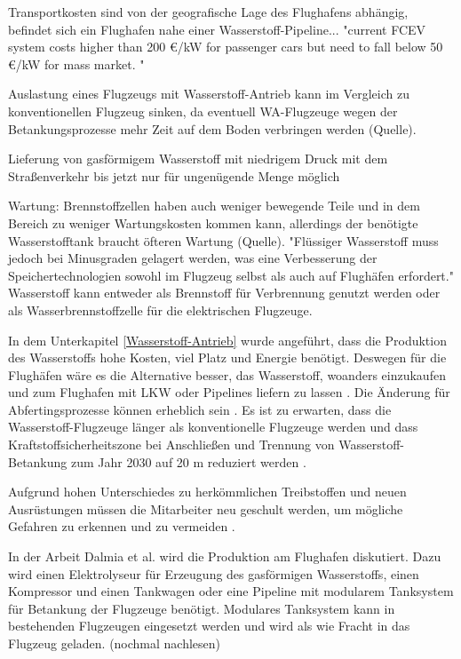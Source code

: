 Transportkosten sind von der geografische Lage des Flughafens abhängig, befindet sich ein Flughafen nahe einer Wasserstoff-Pipeline...
"current FCEV system costs higher than 200 €/kW for passenger cars but need 
to fall below 50 €/kW for mass market. " \cite{undertaking2022strategic}

Auslastung eines Flugzeugs mit Wasserstoff-Antrieb kann im Vergleich zu konventionellen Flugzeug sinken, da eventuell WA-Flugzeuge wegen der Betankungsprozesse
mehr Zeit auf dem Boden verbringen werden (Quelle).

Lieferung von gasförmigem Wasserstoff mit niedrigem Druck mit dem Straßenverkehr bis jetzt nur für ungenügende Menge möglich \cite{undertaking2022strategic}

Wartung:
Brennstoffzellen haben auch weniger bewegende Teile \cite{dalmia2022powering} und in dem Bereich zu weniger Wartungskosten kommen kann,
allerdings der benötigte Wasserstofftank braucht öfteren Wartung (Quelle).
%
"Flüssiger Wasserstoff muss jedoch bei Minusgraden gelagert werden, was eine Verbesserung der Speichertechnologien sowohl im Flugzeug selbst als auch auf Flughäfen erfordert."
Wasserstoff kann entweder als Brennstoff für Verbrennung genutzt werden oder als Wasserbrennstoffzelle für die elektrischen Flugzeuge. \cite{dalmia2022powering}

In dem Unterkapitel \ref{Wasserstoff-Antrieb} wurde angeführt, dass die Produktion des Wasserstoffs hohe Kosten, viel Platz und Energie benötigt. 
Deswegen für die Flughäfen wäre es die Alternative besser, das Wasserstoff, woanders einzukaufen und zum Flughafen 
mit LKW oder Pipelines liefern zu lassen \cite{gu2023hydrogen}. Die Änderung für Abfertingsprozesse können erheblich sein \cite{ati_hydrogen_infrastructure}. Es ist zu erwarten, dass die Wasserstoff-Flugzeuge länger als konventionelle Flugzeuge werden
und dass Kraftstoffsicherheitszone bei Anschließen und Trennung von Wasserstoff-Betankung zum Jahr 2030 auf 20 m reduziert werden \cite{hoelzen2022h2}.

Aufgrund hohen Unterschiedes zu herkömmlichen Treibstoffen und neuen Ausrüstungen müssen die Mitarbeiter neu geschult werden, 
um mögliche Gefahren zu erkennen und zu vermeiden \cite{gu2023hydrogen}.

In der Arbeit Dalmia et al. \cite{dalmia2022powering} wird die Produktion am Flughafen diskutiert. 
Dazu wird einen Elektrolyseur für Erzeugung des gasförmigen Wasserstoffs, einen Kompressor und einen Tankwagen oder
eine Pipeline mit modularem Tanksystem für Betankung der Flugzeuge benötigt. Modulares Tanksystem kann in bestehenden Flugzeugen eingesetzt werden
und wird als wie Fracht in das Flugzeug geladen. (nochmal nachlesen)

